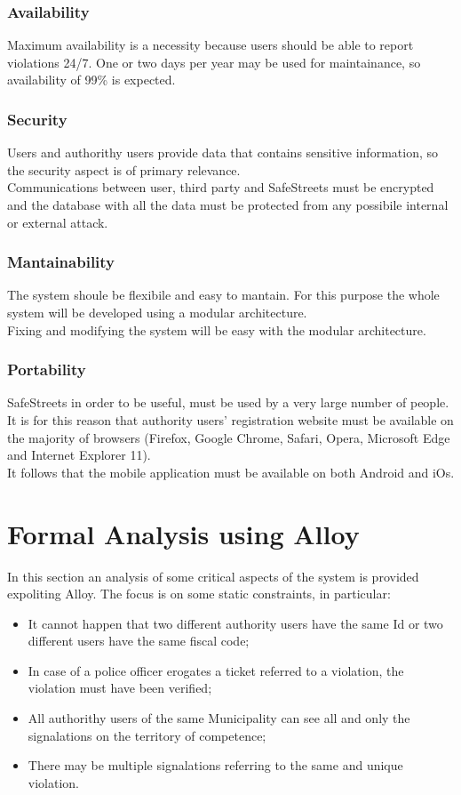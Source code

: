 \documentclass{article}
\begin{document}
\subsubsection{Availability}
Maximum availability is a necessity because users should be able to report
violations 24/7. One or two days per year may be used for maintainance, so
availability of 99\% is expected.
\subsubsection{Security}
Users and authorithy users provide data that contains sensitive information, so
the security aspect is of primary relevance.\\ Communications between user,
third party and SafeStreets must be encrypted and the database with all the data
must be protected from any possibile internal or external attack.
\subsubsection{Mantainability}
The system shoule be flexibile and easy to mantain. For this purpose the whole
system will be developed using a modular architecture. \\
Fixing and modifying the system will be easy with the modular architecture.

\subsubsection{Portability}
SafeStreets in order to be useful, must be used by a very large number of people.
It is for this reason that authority users' registration website must be available
on the majority of browsers (Firefox, Google Chrome, Safari, Opera, Microsoft
Edge and Internet Explorer 11).\\
It follows that the mobile application must be available on both Android and iOs.

\newpage
\section{Formal Analysis using Alloy}
In this section an analysis of some critical aspects of the system is provided
expoliting Alloy. The focus is on some static constraints, in particular:

\begin{itemize}
    \item It cannot happen that two different authority users have the same Id
    or two different users have the same fiscal code;
    \item In case of a police officer erogates a ticket referred to a violation,
    the violation must have been verified;
    \item All authorithy users of the same Municipality can see all and only the
    signalations on the territory of competence;
    \item There may be multiple signalations referring to the same and unique
    violation.
\end{itemize}
\end{document}

